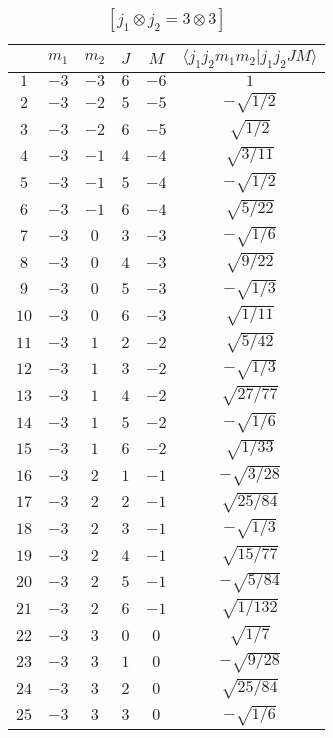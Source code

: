 \begin{table}
\tiny
\caption{$[j_1 \otimes j_2 = 3 \otimes 3]$}
\begin{center}
\begin{tabular}{|c|c|c|c|c|c|}
\hline 
   & $m_1$ & $m_2$ & $J$ & $M$ & $\langle j_1 j_2 m_1 m_2 | j_1 j_2 J M \rangle$ \\ 
\hline 
$1$ & $-3$ & $-3$ & $6$ & $-6$ & $1$ \\ 
$2$ & $-3$ & $-2$ & $5$ & $-5$ & $-\sqrt{1/2}$ \\ 
$3$ & $-3$ & $-2$ & $6$ & $-5$ & $\sqrt{1/2}$ \\ 
$4$ & $-3$ & $-1$ & $4$ & $-4$ & $\sqrt{3/11}$ \\ 
$5$ & $-3$ & $-1$ & $5$ & $-4$ & $-\sqrt{1/2}$ \\ 
$6$ & $-3$ & $-1$ & $6$ & $-4$ & $\sqrt{5/22}$ \\ 
$7$ & $-3$ & $0$ & $3$ & $-3$ & $-\sqrt{1/6}$ \\ 
$8$ & $-3$ & $0$ & $4$ & $-3$ & $\sqrt{9/22}$ \\ 
$9$ & $-3$ & $0$ & $5$ & $-3$ & $-\sqrt{1/3}$ \\ 
$10$ & $-3$ & $0$ & $6$ & $-3$ & $\sqrt{1/11}$ \\ 
$11$ & $-3$ & $1$ & $2$ & $-2$ & $\sqrt{5/42}$ \\ 
$12$ & $-3$ & $1$ & $3$ & $-2$ & $-\sqrt{1/3}$ \\ 
$13$ & $-3$ & $1$ & $4$ & $-2$ & $\sqrt{27/77}$ \\ 
$14$ & $-3$ & $1$ & $5$ & $-2$ & $-\sqrt{1/6}$ \\ 
$15$ & $-3$ & $1$ & $6$ & $-2$ & $\sqrt{1/33}$ \\ 
$16$ & $-3$ & $2$ & $1$ & $-1$ & $-\sqrt{3/28}$ \\ 
$17$ & $-3$ & $2$ & $2$ & $-1$ & $\sqrt{25/84}$ \\ 
$18$ & $-3$ & $2$ & $3$ & $-1$ & $-\sqrt{1/3}$ \\ 
$19$ & $-3$ & $2$ & $4$ & $-1$ & $\sqrt{15/77}$ \\ 
$20$ & $-3$ & $2$ & $5$ & $-1$ & $-\sqrt{5/84}$ \\ 
$21$ & $-3$ & $2$ & $6$ & $-1$ & $\sqrt{1/132}$ \\ 
$22$ & $-3$ & $3$ & $0$ & $0$ & $\sqrt{1/7}$ \\ 
$23$ & $-3$ & $3$ & $1$ & $0$ & $-\sqrt{9/28}$ \\ 
$24$ & $-3$ & $3$ & $2$ & $0$ & $\sqrt{25/84}$ \\ 
$25$ & $-3$ & $3$ & $3$ & $0$ & $-\sqrt{1/6}$ \\ 

\end{tabular}
\end{center}
\end{table}
